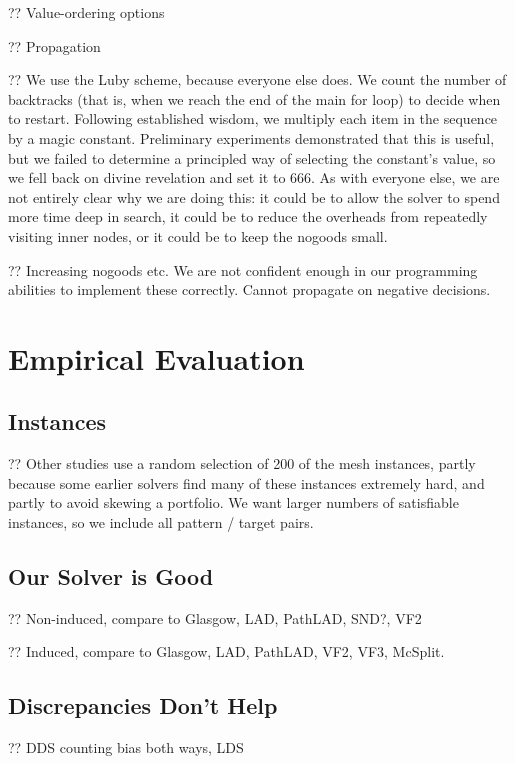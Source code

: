 \documentclass{article}
\begin{document}
?? Value-ordering options

?? Propagation

?? We use the Luby scheme, because everyone else does. We count the number of backtracks (that is,
when we reach the end of the main for loop) to decide when to restart. Following established wisdom,
we multiply each item in the sequence by a magic constant. Preliminary experiments demonstrated that
this is useful, but we failed to determine a principled way of selecting the constant's value, so we
fell back on divine revelation and set it to 666. As with everyone else, we are not entirely clear
why we are doing this: it could be to allow the solver to spend more time deep in search, it could
be to reduce the overheads from repeatedly visiting inner nodes, or it could be to keep the nogoods
small.

?? Increasing nogoods etc. We are not confident enough in our programming abilities to implement
these correctly. Cannot propagate on negative decisions.

\section{Empirical Evaluation}

\subsection{Instances}

?? Other studies use a random selection of 200 of the mesh instances, partly because some earlier
solvers find many of these instances extremely hard, and partly to avoid skewing a portfolio. We
want larger numbers of satisfiable instances, so we include all pattern / target pairs.

\subsection{Our Solver is Good}

?? Non-induced, compare to Glasgow, LAD, PathLAD, SND?, VF2

?? Induced, compare to Glasgow, LAD, PathLAD, VF2, VF3, McSplit.

\subsection{Discrepancies Don't Help}

?? DDS counting bias both ways, LDS
\end{document}
